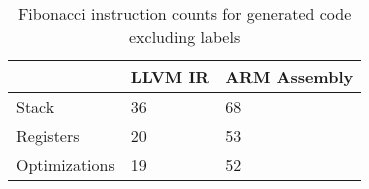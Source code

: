 \begin{table}[h!]
\centering
\begin{tabular}{p{}p{}p{}}
  \hline
 & LLVM IR & ARM Assembly \\ 
  \hline
Stack &  36 &  68 \\ 
  Registers &  20 &  53 \\ 
  Optimizations &  19 &  52 \\ 
   \hline
\end{tabular}
\caption{Fibonacci instruction counts for generated code excluding labels}
\end{table}
